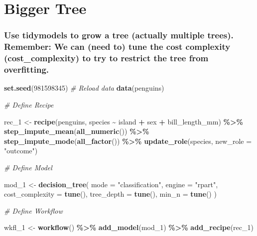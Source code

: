 \documentclass[
]{article}
\newenvironment{Shaded}{\begin{snugshade}}{\end{snugshade}}
\newcommand{\AttributeTok}[1]{\textcolor[rgb]{0.13,0.29,0.53}{#1}}
\newcommand{\CommentTok}[1]{\textcolor[rgb]{0.56,0.35,0.01}{\textit{#1}}}
\newcommand{\DecValTok}[1]{\textcolor[rgb]{0.00,0.00,0.81}{#1}}
\newcommand{\FunctionTok}[1]{\textcolor[rgb]{0.13,0.29,0.53}{\textbf{#1}}}
\newcommand{\NormalTok}[1]{#1}
\newcommand{\OtherTok}[1]{\textcolor[rgb]{0.56,0.35,0.01}{#1}}
\newcommand{\SpecialCharTok}[1]{\textcolor[rgb]{0.81,0.36,0.00}{\textbf{#1}}}
\newcommand{\StringTok}[1]{\textcolor[rgb]{0.31,0.60,0.02}{#1}}
\begin{document}
\section{\texorpdfstring{\textbf{Bigger}
Tree}{Bigger Tree}}\label{bigger-tree}

\subsubsection{Use tidymodels to grow a tree (actually multiple trees).
Remember: We can (need to) tune the cost complexity (cost\_complexity)
to try to restrict the tree from
overfitting.}\label{use-tidymodels-to-grow-a-tree-actually-multiple-trees.-remember-we-can-need-to-tune-the-cost-complexity-cost_complexity-to-try-to-restrict-the-tree-from-overfitting.}

\begin{Shaded}
\begin{Highlighting}[]
\FunctionTok{set.seed}\NormalTok{(}\DecValTok{981598345}\NormalTok{)}
\CommentTok{\# Reload data}
\FunctionTok{data}\NormalTok{(}\StringTok{\textquotesingle{}penguins\textquotesingle{}}\NormalTok{)}

\CommentTok{\# Define Recipe}

\NormalTok{rec\_1 }\OtherTok{\textless{}{-}} \FunctionTok{recipe}\NormalTok{(penguins, species }\SpecialCharTok{\textasciitilde{}}\NormalTok{ island }\SpecialCharTok{+}\NormalTok{ sex }\SpecialCharTok{+}\NormalTok{ bill\_length\_mm) }\SpecialCharTok{\%\textgreater{}\%} 
  \FunctionTok{step\_impute\_mean}\NormalTok{(}\FunctionTok{all\_numeric}\NormalTok{()) }\SpecialCharTok{\%\textgreater{}\%} 
  \FunctionTok{step\_impute\_mode}\NormalTok{(}\FunctionTok{all\_factor}\NormalTok{()) }\SpecialCharTok{\%\textgreater{}\%} 
  \FunctionTok{update\_role}\NormalTok{(species, }\AttributeTok{new\_role =} \StringTok{"outcome"}\NormalTok{)}

\CommentTok{\# Define Model}

\NormalTok{mod\_1 }\OtherTok{\textless{}{-}} \FunctionTok{decision\_tree}\NormalTok{(}
  \AttributeTok{mode =} \StringTok{"classification"}\NormalTok{,}
  \AttributeTok{engine =} \StringTok{"rpart"}\NormalTok{,}
  \AttributeTok{cost\_complexity =} \FunctionTok{tune}\NormalTok{(),}
  \AttributeTok{tree\_depth =} \FunctionTok{tune}\NormalTok{(),}
  \AttributeTok{min\_n =} \FunctionTok{tune}\NormalTok{()}
\NormalTok{)}

\CommentTok{\# Define Workflow}

\NormalTok{wkfl\_1 }\OtherTok{\textless{}{-}} \FunctionTok{workflow}\NormalTok{() }\SpecialCharTok{\%\textgreater{}\%} 
  \FunctionTok{add\_model}\NormalTok{(mod\_1) }\SpecialCharTok{\%\textgreater{}\%} 
  \FunctionTok{add\_recipe}\NormalTok{(rec\_1)}


\end{Highlighting}
\end{Shaded}
\end{document}
